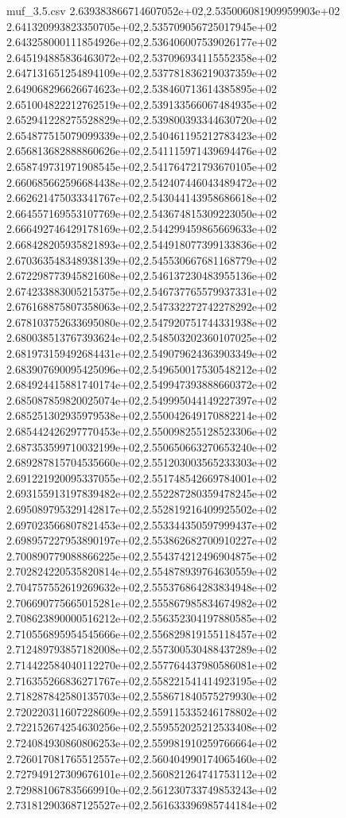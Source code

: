 \begin{filecontents*}{muf_3.5.csv}
2.639383866714607052e+02,2.535006081909959903e+02
2.641320993823350705e+02,2.535709056725017945e+02
2.643258000111854926e+02,2.536406007539026177e+02
2.645194885836463072e+02,2.537096934115552358e+02
2.647131651254894109e+02,2.537781836219037359e+02
2.649068296626674623e+02,2.538460713614385895e+02
2.651004822212762519e+02,2.539133566067484935e+02
2.652941228275528829e+02,2.539800393344630720e+02
2.654877515079099339e+02,2.540461195212783423e+02
2.656813682888860626e+02,2.541115971439694476e+02
2.658749731971908545e+02,2.541764721793670105e+02
2.660685662596684438e+02,2.542407446043489472e+02
2.662621475033341767e+02,2.543044143958686618e+02
2.664557169553107769e+02,2.543674815309223050e+02
2.666492746429178169e+02,2.544299459865669633e+02
2.668428205935821893e+02,2.544918077399133836e+02
2.670363548348938139e+02,2.545530667681168779e+02
2.672298773945821608e+02,2.546137230483955136e+02
2.674233883005215375e+02,2.546737765579937331e+02
2.676168875807358063e+02,2.547332272742278292e+02
2.678103752633695080e+02,2.547920751744331938e+02
2.680038513767393624e+02,2.548503202360107025e+02
2.681973159492684431e+02,2.549079624363903349e+02
2.683907690095425096e+02,2.549650017530548212e+02
2.684924415881740174e+02,2.549947393888660372e+02
2.685087859820025074e+02,2.549995044149227397e+02
2.685251302935979538e+02,2.550042649170882214e+02
2.685442426297770453e+02,2.550098255128523306e+02
2.687353599710032199e+02,2.550650663270653240e+02
2.689287815704535660e+02,2.551203003565233303e+02
2.691221920095337055e+02,2.551748542669784001e+02
2.693155913197839482e+02,2.552287280359478245e+02
2.695089795329142817e+02,2.552819216409925502e+02
2.697023566807821453e+02,2.553344350597999437e+02
2.698957227953890197e+02,2.553862682700910227e+02
2.700890779088866225e+02,2.554374212496904875e+02
2.702824220535820814e+02,2.554878939764630559e+02
2.704757552619269632e+02,2.555376864283834948e+02
2.706690775665015281e+02,2.555867985834674982e+02
2.708623890000516212e+02,2.556352304197880585e+02
2.710556895954545666e+02,2.556829819155118457e+02
2.712489793857182008e+02,2.557300530488437289e+02
2.714422584040112270e+02,2.557764437980586081e+02
2.716355266836271767e+02,2.558221541414923195e+02
2.718287842580135703e+02,2.558671840575279930e+02
2.720220311607228609e+02,2.559115335246178802e+02
2.722152674254630256e+02,2.559552025212533408e+02
2.724084930860806253e+02,2.559981910259766664e+02
2.726017081765512557e+02,2.560404990174065460e+02
2.727949127309676101e+02,2.560821264741753112e+02
2.729881067835669910e+02,2.561230733749853243e+02
2.731812903687125527e+02,2.561633396985744184e+02

\end{filecontents*}
